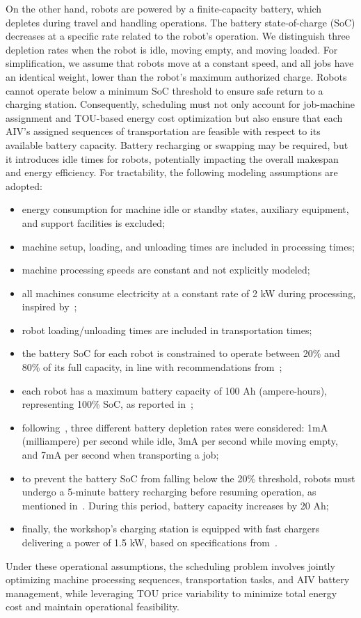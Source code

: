 \documentclass[preprint, 3p, review, 12pt]{elsarticle}
\begin{document}
On the other hand, robots are powered by a finite-capacity battery, which depletes during travel and handling operations. The battery state-of-charge (SoC) decreases at a specific rate related to the robot's operation. We distinguish three depletion rates when the robot is idle, moving empty, and moving loaded. For simplification, we assume that robots move at a constant speed, and all jobs have an identical weight, lower than the robot's maximum authorized charge. Robots cannot operate below a minimum SoC threshold to ensure safe return to a charging station. Consequently, scheduling must not only account for job-machine assignment and TOU-based energy cost optimization but also ensure that each AIV’s assigned sequences of transportation are feasible with respect to its available battery capacity. Battery recharging or swapping may be required, but it introduces idle times for robots, potentially impacting the overall makespan and energy efficiency. For tractability, the following modeling assumptions are adopted:
\begin{itemize}
    \item energy consumption for machine idle or standby states, auxiliary equipment, and support facilities is excluded;
    \item machine setup, loading, and unloading times are included in processing times;
    \item machine processing speeds are constant and not explicitly modeled;
    \item all machines consume electricity at a constant rate of 2 kW during processing, inspired by~\cite{VISWANATHAN20221409};
    \item robot loading/unloading times are included in transportation times;
    \item the battery SoC for each robot is constrained to operate between 20\% and 80\% of its full capacity, in line with recommendations from~\cite{en13133435, Qazi2019};
    \item each robot has a maximum battery capacity of 100 Ah (ampere-hours), representing 100\% SoC, as reported in~\cite{en13184948};
    \item following~\cite{mchaney1995modelling, en13184948}, three different battery depletion rates were considered: 1mA (milliampere) per second while idle, 3mA per second while moving empty, and 7mA per second when transporting a job;
    \item to prevent the battery SoC from falling below the 20\% threshold, robots must undergo a 5-minute battery recharging before resuming operation, as mentioned in~\cite{mwpvl}. During this period, battery capacity increases by 20 Ah;
    \item finally, the workshop's charging station is equipped with fast chargers delivering a power of 1.5 kW, based on specifications from~\cite{Phihong}. 
\end{itemize}
Under these operational assumptions, the scheduling problem involves jointly optimizing machine processing sequences, transportation tasks, and AIV battery management, while leveraging TOU price variability to minimize total energy cost and maintain operational feasibility.
\end{document}
